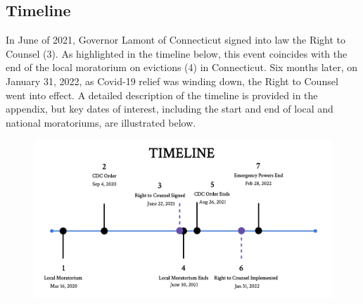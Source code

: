 \documentclass[a4paper,12pt]{article}
\begin{document}
\subsection{Timeline}
In June of 2021, Governor Lamont of Connecticut signed into law the Right to Counsel (3). As highlighted in the timeline below, this event coincides with the end of the local moratorium on evictions (4) in Connecticut. Six months later, on January 31, 2022, as Covid-19 relief was winding down, the Right to Counsel went into effect. A detailed description of the timeline is provided in the appendix, but key dates of interest, including the start and end of local and national moratoriums, are illustrated below. 
\par 
\begin{figure}[htbp]
\centering
    \centering
    \includegraphics[width=.60\linewidth]{figures/rtc/context/timeline.png}
    \label{SUBFIGURE LABEL 3}
\end{figure}
\end{document}
